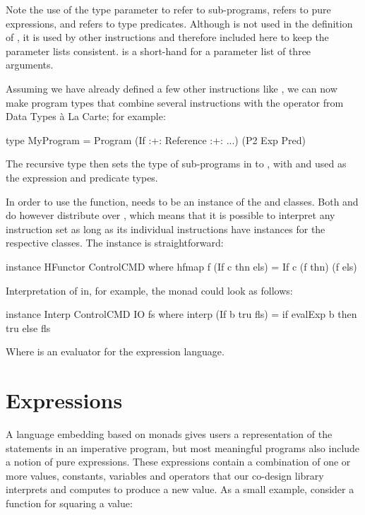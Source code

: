 \documentclass[../paper.tex]{subfiles}
\begin{document}
\noindent Note the use of the type parameter  to refer to sub-programs,  refers to pure expressions, and  refers to type predicates. Although  is not used in the definition of , it is used by other instructions and therefore included here to keep the parameter lists consistent.  is a short-hand for a parameter list of three arguments.

Assuming we have already defined a few other instructions like , we can now make program types that combine several instructions with the \codei{:+:} operator from Data Types \`{a} La Carte; for example:

\begin{code}
type MyProgram = Program (If :+: Reference :+: ...) (P2 Exp Pred)
\end{code}

\noindent The recursive  type then sets the type of sub-programs in  to , with  and  used as the expression and predicate types.

In order to use the  function,  needs to be an instance of the  and  classes. Both  and  do however distribute over \codei{:+:}, which means that it is possible to interpret any instruction set as long as its individual instructions have instances for the respective classes. The  instance is straightforward:

\begin{code}
instance HFunctor ControlCMD where
  hfmap f (If c thn els) = If c (f thn) (f els)
\end{code}

\noindent Interpretation of  in, for example, the  monad could look as follows:

\begin{code}
instance Interp ControlCMD IO fs where
  interp (If b tru fls) = if evalExp b then tru else fls
\end{code}

\noindent Where  is an evaluator for the expression language.

\section{Expressions}
\label{expr}

A language embedding based on monads gives users a representation of the statements in an imperative program, but most meaningful programs also include a notion of pure expressions. These expressions contain a combination of one or more values, constants, variables and operators that our co-design library interprets and computes to produce a new value. As a small example, consider a function for squaring a value:
\end{document}
